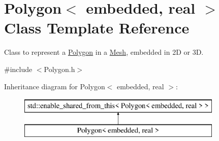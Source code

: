 \hypertarget{class_polygon}{}\section{Polygon$<$ embedded, real $>$ Class Template Reference}
\label{class_polygon}


Class to represent a \hyperlink{class_polygon}{Polygon} in a \hyperlink{class_mesh}{Mesh}, embedded in 2D or 3D.  




{\ttfamily \#include $<$Polygon.\+h$>$}

Inheritance diagram for Polygon$<$ embedded, real $>$\+:\begin{figure}[H]
\begin{center}
\leavevmode
\includegraphics[height=2.000000cm]{class_polygon}
\end{center}
\end{figure}
